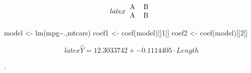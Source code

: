 \documentclass[
]{article}
\newenvironment{Shaded}{\begin{snugshade}}{\end{snugshade}}
\newcommand{\DecValTok}[1]{\textcolor[rgb]{0.00,0.00,0.81}{#1}}
\newcommand{\FunctionTok}[1]{\textcolor[rgb]{0.00,0.00,0.00}{#1}}
\newcommand{\NormalTok}[1]{#1}
\newcommand{\OtherTok}[1]{\textcolor[rgb]{0.56,0.35,0.01}{#1}}
\newcommand{\SpecialCharTok}[1]{\textcolor[rgb]{0.00,0.00,0.00}{#1}}
\begin{document}
\[latex
\begin{tabular}{ll}
A & B \\
A & B \\
\end{tabular}\]

\begin{Shaded}
\begin{Highlighting}[]
\NormalTok{model }\OtherTok{\textless{}{-}} \FunctionTok{lm}\NormalTok{(mpg}\SpecialCharTok{\textasciitilde{}}\NormalTok{.,mtcars)}
\NormalTok{ coef1 }\OtherTok{\textless{}{-}} \FunctionTok{coef}\NormalTok{(model)[[}\DecValTok{1}\NormalTok{]]}
\NormalTok{ coef2 }\OtherTok{\textless{}{-}} \FunctionTok{coef}\NormalTok{(model)[[}\DecValTok{2}\NormalTok{]]}
\end{Highlighting}
\end{Shaded}

\[latex \hat{Y}= 12.3033742 + -0.1114405 \cdot Length\]


\theoremstyle{definition}
\newtheorem{D}{Definition}
\newtheorem{B}{Beispiel}
\newtheorem{Satz}{Satz}
\newtheorem{N}{Notation}

{\topsep}%
{\topsep}%
{\normalfont}%
{}%
{\bfseries}%
{.}%
{\newline}
{}%

\theoremstyle{break}
\newtheorem{R}{Regularität}
\newtheorem{Bsp.}[B]{Beispiel}
\newtheorem{Sch}{Schema}

\newcommand{\lingforestpittner}[3]{%
    \noindent\makebox[\textwidth]{
        \begin{forest}
            where n children=0{tier=word}{},
            for tree={l=#1pt}
            []
    \end{forest}}
}




\newcommand{\klammer}[2]{[#1]\textsubscript{\textbf{#2}}}
\newcommand{\Klammer}[2]{$\biggl[$#1$\biggr]$\textsubscript{\textbf{#2}}}
\newcommand{\KKlammer}[2]{$\Biggl[$#1$\biggr]$\textsubscript{\textbf{#2}}}
\newcommand{\pos}[1]{\textsubscript{\textbf{#1}}}

\newcommand{\greenklammer}[2]{\textcolor{dartmouthgreen}{[}#1\textcolor{dartmouthgreen}{]}\textsubscript{\textbf{#2}}}
\newcommand{\greenKlammer}[2]{$\color{dartmouthgreen}\biggl[$#1$\color{dartmouthgreen}\biggr]$\textsubscript{\textbf{#2}}}
\newcommand{\greenKKlammer}[2]{$\color{dartmouthgreen}\Biggl[$#1$\color{dartmouthgreen}\Biggr]$\textsubscript{\textbf{#2}}}
\newcommand{\green}[1]{\textcolor{dartmouthgreen}{#1}}
\end{document}
